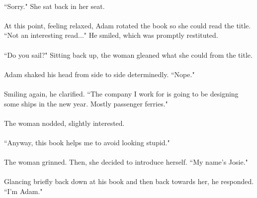 \documentclass{article}
\begin{document}
\paragraph{}
``Sorry." She sat back in her seat.

\paragraph{}
At this point, feeling relaxed, Adam rotated the book so she could read the title. ``Not an interesting read..." He smiled, which was promptly restituted.

\paragraph{}
``Do you sail?" Sitting back up, the woman gleaned what she could from the title.

\paragraph{}
Adam shaked his head from side to side determinedly. ``Nope."

\paragraph{}
Smiling again, he clarified. ``The company I work for is going to be designing some ships in the new year. Mostly passenger ferries."

\paragraph{}
The woman nodded, slightly interested.

\paragraph{}
``Anyway, this book helps me to avoid looking stupid."

\paragraph{}
The woman grinned. Then, she decided to introduce herself. ``My name's Josie."

\paragraph{}
Glancing briefly back down at his book and then back towards her, he responded. ``I'm Adam."
\end{document}
